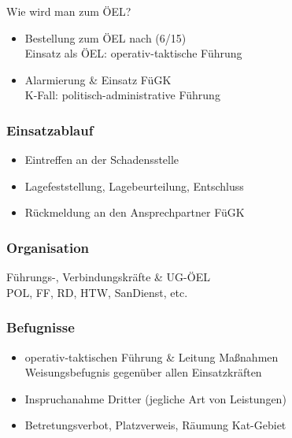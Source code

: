 \begin{warningbox}{Wie wird man zum ÖEL?}
    \begin{itemize}
        \item Bestellung zum ÖEL nach (6/15)\\
        \ra Einsatz als ÖEL: operativ-taktische Führung
        \item Alarmierung \& Einsatz FüGK\\
        \ra K-Fall: politisch-administrative Führung
    \end{itemize}
\end{warningbox}
\begin{normbox}{\subsubsection{Einsatzablauf}}
    \begin{itemize}
        \item Eintreffen an der Schadensstelle
        \item Lagefeststellung, Lagebeurteilung, Entschluss
        \item Rückmeldung an den Ansprechpartner FüGK
    \end{itemize}
\end{normbox}
\begin{normbox}{\subsubsection{Organisation}}
    Führungs-, Verbindungskräfte \& UG-ÖEL\\
    \ra POL, FF, RD, HTW, SanDienst, etc. 
\end{normbox}
\begin{normbox}{\subsubsection{Befugnisse}}
    \begin{itemize}
        \item operativ-taktischen Führung \& Leitung Maßnahmen\\
        \ra Weisungsbefugnis gegenüber allen Einsatzkräften
        \item Inspruchanahme Dritter (jegliche Art von Leistungen)
        \item Betretungsverbot, Platzverweis, Räumung Kat-Gebiet
    \end{itemize}
\end{normbox}
